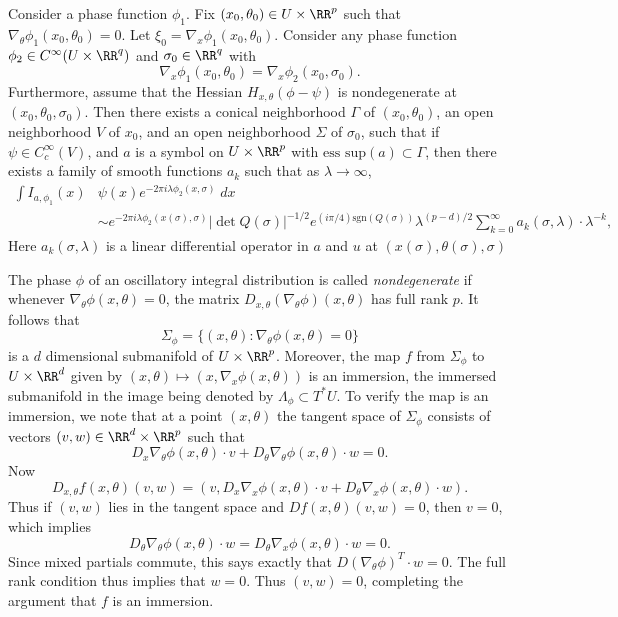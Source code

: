 \begin{theorem}
    Consider a phase function $\phi_1$. Fix $(x_0,\theta_0) \in U \times \RR^p$ such that $\nabla_\theta \phi_1(x_0,\theta_0) = 0$. Let $\xi_0 = \nabla_x \phi_1(x_0,\theta_0)$. Consider any phase function $\phi_2 \in C^\infty(U \times \RR^q)$ and $\sigma_0 \in \RR^q$ with
    \[ \nabla_x \phi_1(x_0,\theta_0) = \nabla_x \phi_2(x_0,\sigma_0). \]
    Furthermore, assume that the Hessian $H_{x,\theta} (\phi - \psi)$ is nondegenerate at $(x_0,\theta_0,\sigma_0)$. Then there exists a conical neighborhood $\Gamma$ of $(x_0,\theta_0)$, an open neighborhood $V$ of $x_0$, and an open neighborhood $\Sigma$ of $\sigma_0$, such that if $\psi \in C_c^\infty(V)$, and $a$ is a symbol on $U \times \RR^p$ with $\text{ess sup}(a) \subset \Gamma$, then there exists a family of smooth functions $a_k$ such that as $\lambda \to \infty$,
    \begin{align*}
        \int I_{a,\phi_1}(x) & \psi(x) e^{-2 \pi i \lambda \phi_2(x,\sigma)}\; dx\\
        &\sim e^{-2 \pi i \lambda \phi_2(x(\sigma),\sigma)} |\det Q(\sigma)|^{-1/2} e^{(i \pi/4) \text{sgn}(Q(\sigma))} \lambda^{(p-d)/2} \sum_{k = 0}^\infty a_k(\sigma,\lambda) \cdot \lambda^{-k},
    \end{align*}
    Here $a_k(\sigma,\lambda)$ is a linear differential operator in $a$ and $u$ at $(x(\sigma), \theta(\sigma), \sigma)$
\end{theorem}

The phase $\phi$ of an oscillatory integral distribution is called \emph{nondegenerate} if whenever $\nabla_\theta \phi(x,\theta) = 0$, the matrix $D_{x,\theta}(\nabla_\theta \phi)(x,\theta)$ has full rank $p$. It follows that
%
\[ \Sigma_\phi = \{ (x,\theta): \nabla_\theta \phi(x,\theta) = 0 \} \]
%
is a $d$ dimensional submanifold of $U \times \RR^p$. Moreover, the map $f$ from $\Sigma_\phi$ to $U \times \RR^d$ given by $(x,\theta) \mapsto (x,\nabla_x \phi(x,\theta))$ is an immersion, the immersed submanifold in the image being denoted by $\Lambda_\phi \subset T^* U$. To verify the map is an immersion, we note that at a point $(x,\theta)$ the tangent space of $\Sigma_\phi$ consists of vectors $(v,w) \in \RR^d \times \RR^p$ such that
%
\[ D_x \nabla_\theta \phi(x,\theta) \cdot v + D_\theta \nabla_\theta \phi(x,\theta) \cdot w = 0. \]
%
Now
%
\[ D_{x,\theta}f(x,\theta)(v,w) = (v, D_x \nabla_x \phi(x,\theta) \cdot v + D_\theta \nabla_x \phi(x,\theta) \cdot w ). \]
%
Thus if $(v,w)$ lies in the tangent space and $Df(x,\theta)(v,w) = 0$, then $v = 0$, which implies
%
\[ D_\theta \nabla_\theta \phi(x,\theta) \cdot w = D_\theta \nabla_x \phi(x,\theta) \cdot w = 0. \]
%
Since mixed partials commute, this says exactly that $D(\nabla_\theta \phi)^T \cdot w = 0$. The full rank condition thus implies that $w = 0$. Thus $(v,w) = 0$, completing the argument that $f$ is an immersion.

